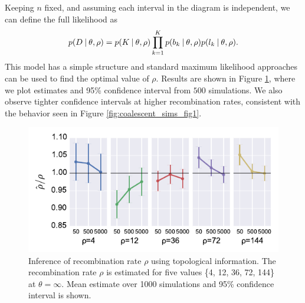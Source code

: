 Keeping $n$ fixed, and assuming each interval in the diagram is independent, we can define the full likelihood as
\begin{equation}
p(D \:\vert\: \theta,\rho) = p(K \:\vert\: \theta,\rho)\displaystyle\prod_{k=1}^{K}p(b_k \:\vert\: \theta,\rho)p(l_k  \:\vert\: \theta,\rho).
\end{equation}
This model has a simple structure and standard maximum likelihood approaches can be used to find the optimal value of $\rho$.
Results are shown in Figure \ref{fig:param_inference}, where we plot estimates and 95\% confidence interval from $500$ simulations.
We also observe tighter confidence intervals at higher recombination rates, consistent with the behavior seen in Figure \ref{fig:coalescent_sims_fig1}.

\begin{figure}
\centering
\includegraphics[width=\columnwidth]{./fig/parametric_inference/param_inference.pdf}
\caption[Inference of recombination rate $\rho$ using topological information]{Inference of recombination rate $\rho$ using topological information. The recombination rate $\rho$ is estimated for five values \{4, 12, 36, 72, 144\} at $\theta=\infty$. Mean estimate over 1000 simulations and 95\% confidence interval is shown.}
\label{fig:param_inference}
\end{figure}

